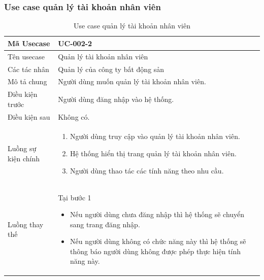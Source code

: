 \documentclass[12pt,a4paper]{article}
\begin{document}
    \subsubsection*{Use case quản lý tài khoản nhân viên}
    \begin{table}[H]
        \centering
        \begin{tabular}{|p{3.5cm}|p{11.5cm}|c|}
            \hline
            Mã Usecase      & UC-002-2                                     \\
            \hline
            Tên usecase     & Quản lý tài khoản nhân viên                  \\
            \hline
            Các tác nhân    & Quản lý của công ty bất động sản             \\
            \hline
            Mô tả chung     & Người dùng muốn quản lý tài khoản nhân viên. \\
            \hline
            Điều kiện trước & Người dùng đăng nhập vào hệ thống.           \\
            \hline
            Điều kiện sau   & Không có.                                    \\
            \hline
            Luồng sự kiện chính & \vspace{-.8cm}\begin{enumerate}
                                                    \item Người dùng truy cập vào quản lý tài khoản nhân viên.
                                                    \item Hệ thống hiển thị trang quản lý tài khoản nhân viên.
                                                    \item Người dùng thao tác các tính năng theo nhu cầu.
            \end{enumerate}
            \\
            \hline
            Luồng thay thế & Tại bước 1\newline
            \vspace{-.8cm}\begin{itemize}
                              \item Nếu người dùng chưa đăng nhập thì hệ thống sẽ chuyển sang trang đăng nhập.
                              \item Nếu người dùng không có chức năng này thì hệ thống sẽ thông báo người dùng không được phép thực hiện tính năng này.
            \end{itemize}

            \\ \hline
        \end{tabular}
        \caption{Use case quản lý tài khoản nhân viên}
    \end{table}
\end{document}
